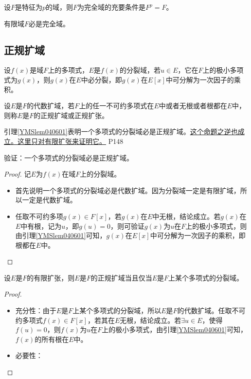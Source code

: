 \begin{theorem}
	设$F$是特征为$p$的域，则$F$为完全域的充要条件是$F^{p}=F$。
\end{theorem}

\begin{corollary}
	有限域$F$必是完全域。
\end{corollary}



\subsection{正规扩域}

\begin{lemma}\label{YMSlem040601}
	设$f(x)$是域$F$上的多项式，$E$是$f(x)$的分裂域，若$u\in E$，它在$F$上的极小多项式为$g(x)$，则$g(x)$在$E$中必分裂，即$g(x)$在$E[x]$中可分解为一次因子的乘积。
\end{lemma}


\begin{definition}
	设$E$是$F$的代数扩域，若$F$上的任一不可约多项式在$E$中或者无根或者根都在$E$中，则称$E$是$F$的正规扩域或正规扩张。
\end{definition}

\original
{
	引理\ref{YMSlem040601}表明一个多项式的分裂域必是正规扩域。\uline{这个命题之逆也成立。这里只对有限扩张来证明它。}
}
{P148}

\begin{proposition}
	验证：一个多项式的分裂域必是正规扩域。
\end{proposition}

\begin{proof}
	记$E$为$f(x)$在域$F$上的分裂域。
	\begin{itemize}
		\item 首先说明一个多项式的分裂域必是代数扩域。因为分裂域一定是有限扩域，所以一定是代数扩域。
		\item 任取不可约多项$g(x)\in F[x]$，若$g(x)$在$E$中无根，结论成立。若$g(x)$在$E$中有根，记为$u$，即$g(u)=0$，则可验证$g(x)$为$u$在$F$上的极小多项式，则由引理\ref{YMSlem040601}可知，$g(x)$在$E[x]$中可分解为一次因子的乘积，即根都在$E$中。
	\end{itemize}
\end{proof}

\begin{theorem}\label{YMSthe040601}
	设$E$是$F$的有限扩张，则$E$是$F$的正规扩域当且仅当$E$是$F$上某个多项式的分裂域。
\end{theorem}

\begin{proof}
	\begin{itemize}
		\item 充分性：由于$E$是$F$上某个多项式的分裂域，所以$E$是$F$的代数扩域。任取不可约多项式$f(x)\in F[x]$，若其在$E$无根，结论成立。若$\exists u\in E$，使得$f(u)=0 $，则$f(x)$为$u$在$F$上的极小多项式，由引理\ref{YMSlem040601}可知，$f(x)$的所有根在$E$中。
		\item 必要性：
	\end{itemize}
\end{proof}

